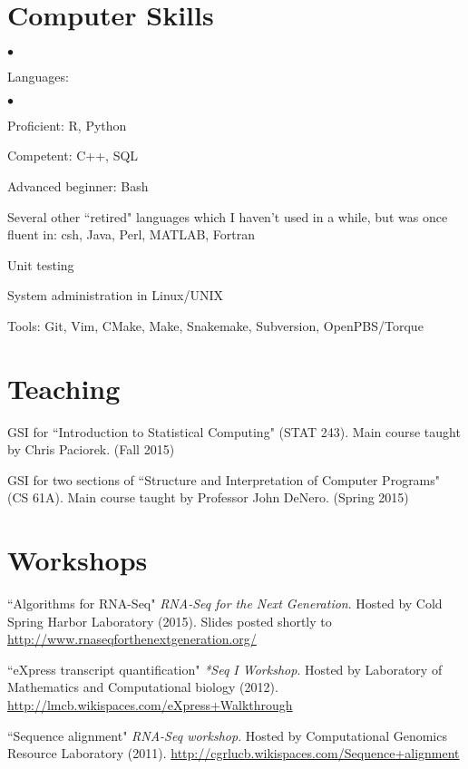 \documentclass[margin,line]{res}
\newenvironment{list2}{
  \begin{list}{$\bullet$}{%
      \setlength{\itemsep}{0in}
      \setlength{\parsep}{0in} \setlength{\parskip}{0in}
      \setlength{\topsep}{0in} \setlength{\partopsep}{0in}
      \setlength{\leftmargin}{0.2in}}}{\end{list}}
\begin{document}
\begin{resume}
\section{\sc Computer Skills}
\begin{list2}
\item Languages:
  \begin{list2}
    \item Proficient: R, Python
    \item Competent: C++, SQL
    \item Advanced beginner: Bash
  \end{list2}
\item Several other ``retired" languages which I haven't used in a while,
  but was once fluent in: csh, Java, Perl, MATLAB, Fortran
\item Unit testing
\item System administration in Linux/UNIX
\item Tools: Git, Vim, CMake, Make, Snakemake, Subversion, OpenPBS/Torque\\
\end{list2}
\vspace{-.65cm}

\section{\sc Teaching}
GSI for ``Introduction to Statistical Computing" (STAT 243). Main course taught
by Chris Paciorek. (Fall 2015)

GSI for two sections of ``Structure and Interpretation of Computer Programs"
(CS 61A). Main course taught by Professor John DeNero. (Spring 2015)

\section{\sc Workshops}
``Algorithms for RNA-Seq" {\emph{RNA-Seq for the Next Generation}}. Hosted by Cold Spring Harbor Laboratory (2015). Slides posted shortly to \url{http://www.rnaseqforthenextgeneration.org/}

``eXpress transcript quantification" {\emph{*Seq I Workshop}}. Hosted by Laboratory of Mathematics and Computational biology (2012). \url{http://lmcb.wikispaces.com/eXpress+Walkthrough}

``Sequence alignment" {\emph{RNA-Seq workshop}}. Hosted by Computational Genomics Resource Laboratory (2011).  \url{http://cgrlucb.wikispaces.com/Sequence+alignment}


\end{resume}
\end{document}
